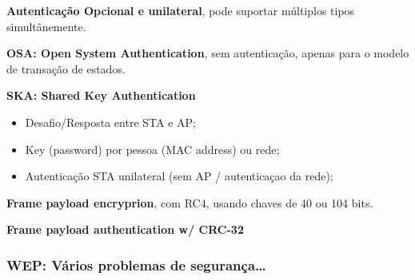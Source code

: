 \documentclass{article}
\begin{document}
\begin{flushleft}
  \textbf{Autenticação Opcional e unilateral}, pode suportar
  múltiplos tipos simultânemente.

  \vspace{2mm}

  \textbf{OSA: Open System Authentication}, sem autenticação,
  apenas para o modelo de transação de estados.

  \vspace{2mm}

  \textbf{SKA: Shared Key Authentication}
  \begin{itemize}
    \item Desafio/Resposta entre STA e AP;
    \item Key (password) por pessoa (MAC address) ou rede;
    \item Autenticação STA unilateral (sem AP / autenticaçao da rede);
  \end{itemize}

  \vspace{2mm}

  \textbf{Frame payload encryprion}, com RC4, usando chaves de 40 ou 104 bits.

  \vspace{2mm}

  \textbf{Frame payload authentication w/ CRC-32}
\end{flushleft}

\subsubsection{WEP: Vários problemas de segurança\dots}
\end{document}
